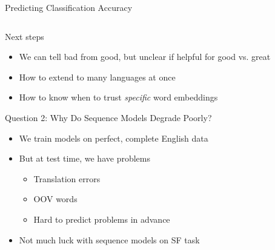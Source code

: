 \documentclass[compress]{beamer}
\begin{document}
\begin{frame}{Predicting Classification Accuracy}
\begin{columns}
\begin{center}
  \end{center}
\end{columns}
\vspace{1cm}

\end{frame}

\begin{frame}{Next steps}

  \begin{itemize}
    \item We can tell bad from good, but unclear if helpful for good
      vs. great
    \item How to extend to many languages at once
    \item How to know when to trust \emph{specific} word embeddings
  \end{itemize}

\end{frame}

\begin{frame}{Question 2: Why Do Sequence Models Degrade Poorly?}

\begin{itemize}
  \item We train models on perfect, complete English data
  \item But at test time, we have problems
    \begin{itemize}
      \item Translation errors
      \item OOV words
      \item Hard to predict problems in advance
    \end{itemize}
  \item Not much luck with sequence models on SF task
\end{itemize}

\end{frame}
\end{document}
